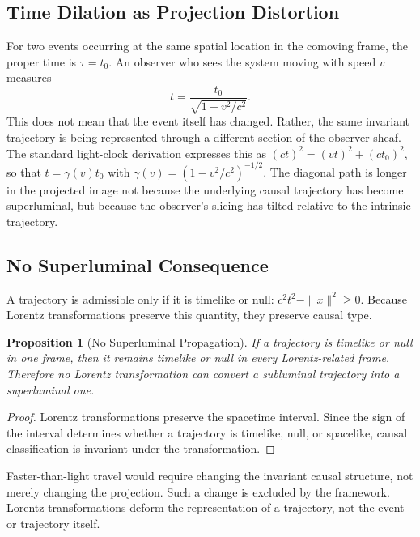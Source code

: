 \documentclass[11pt, a4paper, twocolumn]{article}
\newtheorem{proposition}[definition]{Proposition}
\begin{document}
\subsection{Time Dilation as Projection Distortion}

For two events occurring at the same spatial location in the comoving frame,
the proper time is $\tau = t_0$. An observer who sees the system moving with
speed $v$ measures
\[
    t = \frac{t_0}{\sqrt{1-v^2/c^2}}.
\]
This does not mean that the event itself has changed. Rather, the same invariant
trajectory is being represented through a different section of the observer
sheaf. The standard light-clock derivation expresses this as
$(ct)^2 = (vt)^2 + (ct_0)^2$, so that $t = \gamma(v)t_0$ with
$\gamma(v) = (1-v^2/c^2)^{-1/2}$. The diagonal path is longer in the projected
image not because the underlying causal trajectory has become superluminal, but
because the observer's slicing has tilted relative to the intrinsic trajectory.

\subsection{No Superluminal Consequence}

A trajectory is admissible only if it is timelike or null:
$c^2t^2-\|x\|^2 \geq 0$. Because Lorentz transformations preserve this
quantity, they preserve causal type.

\begin{proposition}[No Superluminal Propagation]
If a trajectory is timelike or null in one frame, then it remains timelike or
null in every Lorentz-related frame. Therefore no Lorentz transformation can
convert a subluminal trajectory into a superluminal one.
\end{proposition}

\begin{proof}
Lorentz transformations preserve the spacetime interval. Since the sign of the
interval determines whether a trajectory is timelike, null, or spacelike, causal
classification is invariant under the transformation.
\end{proof}

Faster-than-light travel would require changing the invariant causal structure,
not merely changing the projection. Such a change is excluded by the framework.
Lorentz transformations deform the representation of a trajectory, not the
event or trajectory itself.

\end{document}
